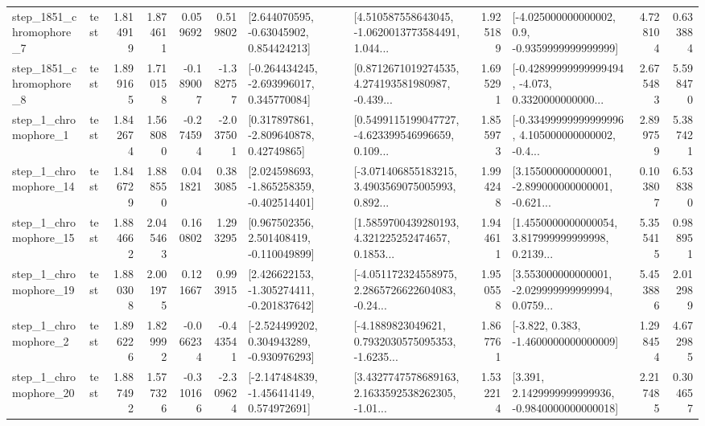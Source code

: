 \begin{tabular}{llrrrrllrlrr}
  step\_1851\_chromophore\_7 &      test &      1.814919 &    1.874611 &      0.059692 &  0.519802 &     [2.644070595, -0.63045902, 0.854424213] &  [4.510587558643045, -1.0620013773584491, 1.044... &       1.925189 &     [-4.025000000000002, 0.9, -0.9359999999999999] &            4.728104 &          0.633884 \\
  step\_1851\_chromophore\_8 &      test &      1.899165 &    1.710158 &     -0.189007 & -1.382757 &   [-0.264434245, -2.693996017, 0.345770084] &  [0.8712671019274535, 4.274193581980987, -0.439... &       1.695291 &  [-0.42899999999999494, -4.073, 0.3320000000000... &            2.675483 &          5.598470 \\
     step\_1\_chromophore\_1 &      test &      1.842674 &    1.568080 &     -0.274594 & -2.037501 &     [0.317897861, -2.809640878, 0.42749865] &  [0.5499115199047727, -4.623399546996659, 0.109... &       1.855973 &  [-0.33499999999999996, 4.105000000000002, -0.4... &            2.899759 &          5.387421 \\
    step\_1\_chromophore\_14 &      test &      1.846729 &    1.888550 &      0.041821 &  0.383085 &   [2.024598693, -1.865258359, -0.402514401] &  [-3.071406855183215, 3.4903569075005993, 0.892... &       1.994248 &  [3.155000000000001, -2.899000000000001, -0.621... &            0.103807 &          6.538380 \\
    step\_1\_chromophore\_15 &      test &      1.884662 &    2.045463 &      0.160802 &  1.293295 &    [0.967502356, 2.501408419, -0.110049899] &  [1.5859700439280193, 4.321225252474657, 0.1853... &       1.944611 &  [1.4550000000000054, 3.817999999999998, 0.2139... &            5.355415 &          0.988951 \\
    step\_1\_chromophore\_19 &      test &      1.880308 &    2.001975 &      0.121667 &  0.993915 &   [2.426622153, -1.305274411, -0.201837642] &  [-4.051172324558975, 2.2865726622604083, -0.24... &       1.950558 &  [3.553000000000001, -2.029999999999994, 0.0759... &            5.453886 &          2.012989 \\
     step\_1\_chromophore\_2 &      test &      1.896226 &    1.829992 &     -0.066234 & -0.443541 &   [-2.524499202, 0.304943289, -0.930976293] &  [-4.1889823049621, 0.7932030575095353, -1.6235... &       1.867761 &               [-3.822, 0.383, -1.4600000000000009] &            1.298454 &          4.672985 \\
    step\_1\_chromophore\_20 &      test &      1.887492 &    1.577326 &     -0.310166 & -2.309624 &   [-2.147484839, -1.456414149, 0.574972691] &  [3.4327747578689163, 2.1633592538262305, -1.01... &       1.532214 &   [3.391, 2.1429999999999936, -0.9840000000000018] &            2.217485 &          0.304657 \\

\end{tabular}
